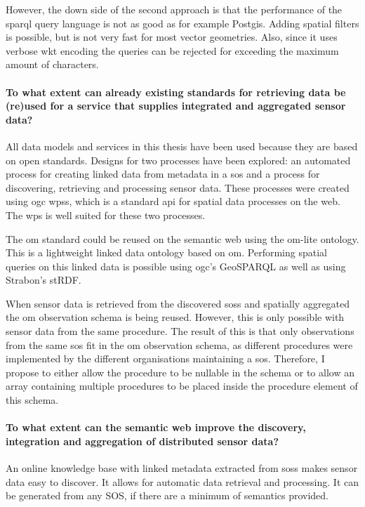 However, the down side of the second approach is that the performance of the \ac{sparql} query language is not as good as for example Postgis. Adding spatial filters is possible, but is not very fast for most vector geometries. Also, since it uses verbose \ac{wkt} encoding the queries can be rejected for exceeding the maximum amount of characters.            


\paragraph{To what extent can already existing standards for retrieving data be (re)used for a service that supplies integrated and aggregated sensor data?}\mbox{}

All data models and services in this thesis have been used because they are based on open standards. Designs for two processes have been explored: an automated process for creating linked data from metadata in a \ac{sos} and a process for discovering, retrieving and processing sensor data. These processes were created using \ac{ogc} \aclp{wps}, which is a standard \ac{api} for spatial data processes on the web. The \ac{wps} is well suited for these two processes.

The \ac{om} standard could be reused on the semantic web using the om-lite ontology. This is a lightweight linked data ontology based on \ac{om}. Performing spatial queries on this linked data is possible using \ac{ogc}'s GeoSPARQL as well as using Strabon's stRDF.

When sensor data is retrieved from the discovered \aclp{sos} and spatially aggregated the \ac{om} observation schema is being reused. However, this is only possible with sensor data from the same procedure. The result of this is that only observations from the same \ac{sos} fit in the \ac{om} observation schema, as different procedures were implemented by the different organisations maintaining a \ac{sos}. Therefore, I propose to either allow the procedure to be nullable in the schema or to allow an array containing multiple procedures to be placed inside the procedure element of this schema.  


\paragraph{To what extent can the semantic web improve the discovery, integration and aggregation of distributed sensor data?}\mbox{}

An online knowledge base with linked metadata extracted from \aclp{sos} makes sensor data easy to discover. It allows for automatic data retrieval and processing. It can be generated from any SOS, if there are a minimum of semantics provided. 
